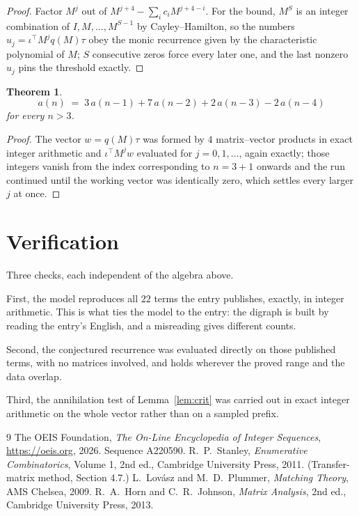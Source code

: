\documentclass[11pt,a4paper]{article}
\theoremstyle{plain}
\newtheorem{theorem}{Theorem}
\theoremstyle{definition}
\begin{document}
\begin{proof}
Factor $M^{j}$ out of $M^{j+4}-\sum_ic_iM^{j+4-i}$. For the bound, $M^{S}$
is an integer combination of $I,M,\dots,M^{S-1}$ by Cayley--Hamilton, so the numbers
$u_j=\iota^{\!\top}M^{j}q(M)\tau$ obey the monic recurrence given by the characteristic
polynomial of $M$; $S$ consecutive zeros force every later one, and the last nonzero $u_j$
pins the threshold exactly.
\end{proof}

\begin{theorem}
\[
a(n)\;=\;3\,a(n-1) + 7\,a(n-2) + 2\,a(n-3) - 2\,a(n-4)
\]
for every $n>3$.
\end{theorem}

\begin{proof}
The vector $w=q(M)\tau$ was formed by $4$ matrix--vector products in exact integer
arithmetic and $\iota^{\!\top}M^{j}w$ evaluated for $j=0,1,\dots$, again exactly; those
integers vanish from the index corresponding to $n=3+1$ onwards and the run continued
until the working vector was identically zero, which settles every larger $j$ at once.
\end{proof}

\section{Verification}

Three checks, each independent of the algebra above.

First, the model reproduces all $22$ terms the entry publishes, exactly, in integer
arithmetic. This is what ties the model to the entry: the digraph is built by reading the
entry's English, and a misreading gives different counts.

Second, the conjectured recurrence was evaluated directly on those published terms, with no
matrices involved, and holds wherever the proved range and the data overlap.

Third, the annihilation test of Lemma~\ref{lem:crit} was carried out in exact integer
arithmetic on the whole vector rather than on a sampled prefix.

\begin{thebibliography}{9}
 The OEIS Foundation, \emph{The On-Line Encyclopedia of Integer
Sequences}, \url{https://oeis.org}, 2026. Sequence A220590.
 R.~P.~Stanley, \emph{Enumerative Combinatorics}, Volume 1, 2nd ed.,
Cambridge University Press, 2011. (Transfer-matrix method, Section 4.7.)
 L.~Lov\'asz and M.~D.~Plummer, \emph{Matching Theory}, AMS Chelsea,
2009.
 R.~A.~Horn and C.~R.~Johnson, \emph{Matrix Analysis}, 2nd ed., Cambridge
University Press, 2013.
\end{thebibliography}
\end{document}
